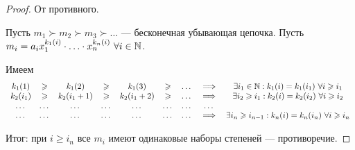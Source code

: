 \begin{proof}
    От противного.

    Пусть $m_1 \succ m_2 \succ m_3 \succ \dots$ --- бесконечная убывающая цепочка. Пусть $m_i = a_i x_1^{k_1(i)} \cdot \ldots \cdot x_n^{k_n(i)} \ \forall i \in \mathbb{N}$.

    Имеем
    \begin{equation*}
        \begin{array}{ccccccccc}
            k_1(1) & \geqslant & k_1(2) & \geqslant & k_1(3) & \geqslant & \dots & \implies & \exists i_1 \in \mathbb{N} : k_1(i) = k_1(i_1) \ \forall i \geqslant i_1 \\
            k_2(i_1) & \geqslant & k_2(i_1 + 1) & \geqslant & k_2(i_1 + 2) & \geqslant & \dots & \implies & \exists i_2 \geqslant i_1 : k_2(i) = k_2(i_2) \ \forall i \geqslant i_2 \\
            \dots & \dots & \dots & \dots & \dots & \dots & \dots & \dots & \\
            \dots & \dots & \dots & \dots & \dots & \dots & \dots & \implies & \exists i_n \geqslant i_{n - 1} : k_n(i) = k_n(i_n) \ \forall i \geqslant i_n
        \end{array}
    \end{equation*}

    \bigskip
    Итог: при $i \geq i_n$ все $m_i$ имеют одинаковые наборы степеней --- противоречие.
\end{proof}
